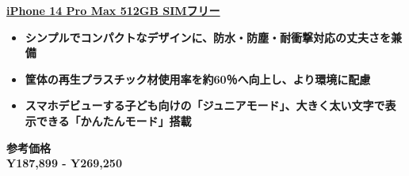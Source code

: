 \documentclass[lualatex,paper=a4,airticle]{jlreq}
\begin{document}
\begin{minipage}[b][0.45\textheight][b]{\textwidth}
\begin{minipage}{0.25\textwidth}
\href{http://www.apple.com}{
}
\end{minipage}%
\hfill
\begin{minipage}{0.85\textwidth}
\href{http://www.apple.com}{\huge{\textbf{iPhone 14 Pro Max 512GB SIMフリー}}}\par
\begin{itemize}
\setlength{\itemindent}{-10pt}
\item {\color{Purple}\mcfamily\bfseries\myfont シンプルでコンパクトなデザインに、防水・防塵・耐衝撃対応の丈夫さを兼備}
\item {\color{Purple}\mcfamily\bfseries\myfont 筐体の再生プラスチック材使用率を約60％へ向上し、より環境に配慮}
\item {\color{Purple}\mcfamily\bfseries\myfont スマホデビューする子ども向けの「ジュニアモード」、大きく太い文字で表示できる「かんたんモード」搭載}
\end{itemize}
\end{minipage}
\vspace{-1\baselineskip}
\begin{multicols}{2}
{\color{red}\textbf{参考価格}}\\
{\LARGE\color{red}\textbf{ Y\llap{=}187,899 - Y\llap{=}269,250}}\\
\\

\columnbreak

\hspace{-1.5cm} %



\end{multicols}
\end{minipage}
\end{document}
